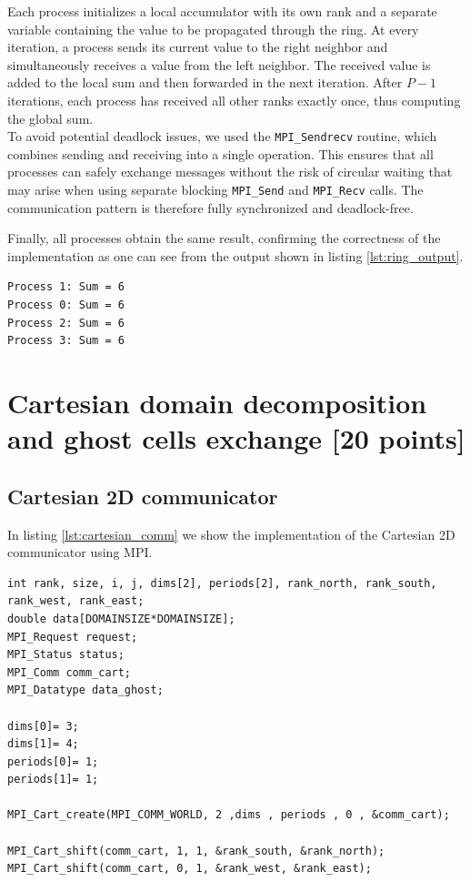 \documentclass[unicode,10pt,a4paper,oneside,numbers=endperiod,openany]{scrartcl}
\begin{document}
Each process initializes a local accumulator with its own rank and a separate variable containing the value to be propagated through the ring. At every iteration, a process sends its current value to the right neighbor and simultaneously receives a value from the left neighbor. The received value is added to the local sum and then forwarded in the next iteration. After $P-1$ iterations, each process has received all other ranks exactly once, thus computing the global sum.\\

To avoid potential deadlock issues, we used the \texttt{MPI\_Sendrecv} routine, which combines sending and receiving into a single operation. This ensures that all processes can safely exchange messages without the risk of circular waiting that may arise when using separate blocking \texttt{MPI\_Send} and \texttt{MPI\_Recv} calls. The communication pattern is therefore fully synchronized and deadlock-free.

Finally, all processes obtain the same result, confirming the correctness of the implementation as one can see from the output shown in listing \ref{lst:ring_output}.
\begin{lstlisting}[style=grayverbatim, caption={Output of ring sum}, label={lst:ring_output}]
Process 1: Sum = 6
Process 0: Sum = 6
Process 2: Sum = 6
Process 3: Sum = 6
\end{lstlisting}

\newpage
\section{Cartesian domain decomposition and ghost cells exchange [20 points]}

\subsection{Cartesian 2D communicator}
In listing \ref{lst:cartesian_comm} we show the implementation of the Cartesian 2D communicator using MPI.
\begin{lstlisting}[style=grayverbatim, caption={Cartesian 2D communicator using MPI}, label={lst:cartesian_comm}]
int rank, size, i, j, dims[2], periods[2], rank_north, rank_south, rank_west, rank_east;
double data[DOMAINSIZE*DOMAINSIZE];
MPI_Request request;
MPI_Status status;
MPI_Comm comm_cart;
MPI_Datatype data_ghost;

dims[0]= 3;
dims[1]= 4;
periods[0]= 1;
periods[1]= 1;

MPI_Cart_create(MPI_COMM_WORLD, 2 ,dims , periods , 0 , &comm_cart);

MPI_Cart_shift(comm_cart, 1, 1, &rank_south, &rank_north);
MPI_Cart_shift(comm_cart, 0, 1, &rank_west, &rank_east);
\end{lstlisting}
\end{document}
